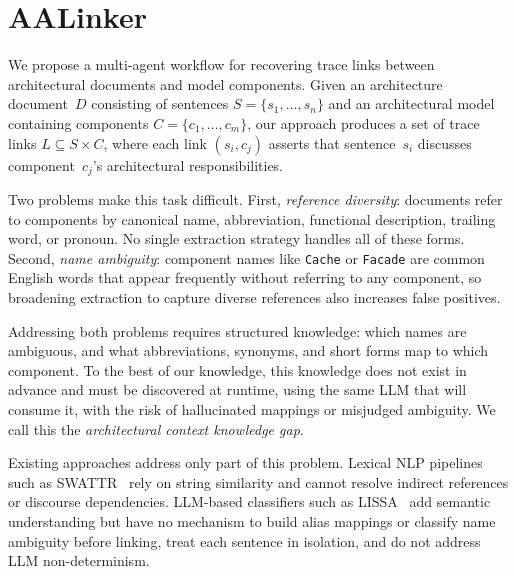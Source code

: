 %

\section{AALinker}\label{sec:approach}

We propose a multi-agent workflow for recovering trace links between
architectural documents and model components.
Given an architecture document~$D$ consisting of sentences
$S = \{s_1, \ldots, s_n\}$ and an architectural model containing
components $C = \{c_1, \ldots, c_m\}$, our approach produces a set of
trace links $L \subseteq S \times C$, where each link $(s_i, c_j)$
asserts that sentence~$s_i$ discusses component~$c_j$'s architectural
responsibilities.

Two problems make this task difficult.
First, \emph{reference diversity}: documents refer to components by
canonical name, abbreviation, functional description, trailing word,
or pronoun.
No single extraction strategy handles all of these forms.
Second, \emph{name ambiguity}: component names like \texttt{Cache} or
\texttt{Facade} are common English words that appear frequently
without referring to any component, so broadening extraction to
capture diverse references also increases false positives.

Addressing both problems requires structured knowledge: which names
are ambiguous, and what abbreviations, synonyms, and short forms map
to which component.
To the best of our knowledge, this knowledge does not exist in advance
and must be discovered at runtime, using the same LLM that will
consume it, with the risk of hallucinated mappings or misjudged
ambiguity.
We call this the \emph{architectural context knowledge gap}.

Existing approaches address only part of this problem.
Lexical NLP pipelines such as SWATTR~\cite{swattr} rely on string
similarity and cannot resolve indirect references or discourse
dependencies.
LLM-based classifiers such as LISSA~\cite{lissa} add semantic
understanding but have no mechanism to build alias mappings or classify
name ambiguity before linking, treat each sentence in isolation, and
do not address LLM non-determinism.


